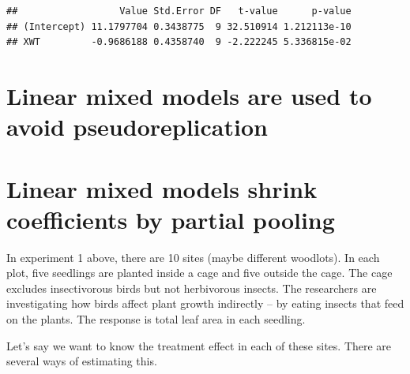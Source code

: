 \documentclass[]{book}
\begin{document}
\begin{verbatim}
##                  Value Std.Error DF   t-value      p-value
## (Intercept) 11.1797704 0.3438775  9 32.510914 1.212113e-10
## XWT         -0.9686188 0.4358740  9 -2.222245 5.336815e-02
\end{verbatim}

\section{Linear mixed models are used to avoid
pseudoreplication}\label{linear-mixed-models-are-used-to-avoid-pseudoreplication}

\section{Linear mixed models shrink coefficients by partial
pooling}\label{linear-mixed-models-shrink-coefficients-by-partial-pooling}

In experiment 1 above, there are 10 sites (maybe different woodlots). In
each plot, five seedlings are planted inside a cage and five outside the
cage. The cage excludes insectivorous birds but not herbivorous insects.
The researchers are investigating how birds affect plant growth
indirectly -- by eating insects that feed on the plants. The response is
total leaf area in each seedling.

Let's say we want to know the treatment effect in each of these sites.
There are several ways of estimating this.
\end{document}
